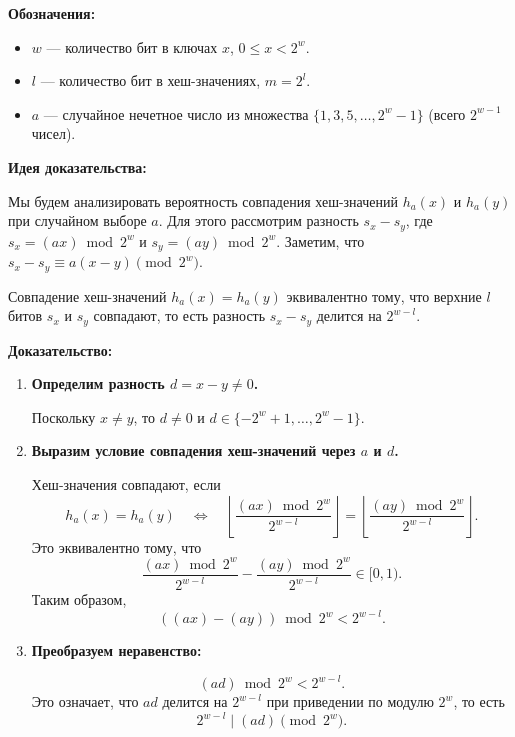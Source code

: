 \documentclass[11pt]{article}
\renewcommand{\le}{\leqslant}   %
\begin{document}
\begin{solution}
    \textbf{Обозначения:}
    
    \begin{itemize}
        \item $w$ — количество бит в ключах $x$, $0 \le x < 2^w$.
        \item $l$ — количество бит в хеш-значениях, $m = 2^l$.
        \item $a$ — случайное нечетное число из множества $\{1, 3, 5, \dots, 2^w - 1\}$ (всего $2^{w - 1}$ чисел).
    \end{itemize}
    
    \textbf{Идея доказательства:}
    
    Мы будем анализировать вероятность совпадения хеш-значений $h_{a}(x)$ и $h_{a}(y)$ при случайном выборе $a$. Для этого рассмотрим разность $s_x - s_y$, где $s_x = (a x) \bmod 2^w$ и $s_y = (a y) \bmod 2^w$. Заметим, что $s_x - s_y \equiv a (x - y) \pmod{2^w}$.
    
    Совпадение хеш-значений $h_{a}(x) = h_{a}(y)$ эквивалентно тому, что верхние $l$ битов $s_x$ и $s_y$ совпадают, то есть разность $s_x - s_y$ делится на $2^{w - l}$.
    
    \textbf{Доказательство:}
    
    \begin{enumerate}
        \item \textbf{Определим разность $d = x - y \not= 0$.}
    
        Поскольку $x \not= y$, то $d \not= 0$ и $d \in \{-2^w + 1, \dots, 2^w - 1\}$.
    
        \item \textbf{Выразим условие совпадения хеш-значений через $a$ и $d$.}
    
        Хеш-значения совпадают, если
        \[
        h_{a}(x) = h_{a}(y) \quad \Leftrightarrow \quad \left\lfloor \dfrac{(a x) \bmod 2^w}{2^{w - l}} \right\rfloor = \left\lfloor \dfrac{(a y) \bmod 2^w}{2^{w - l}} \right\rfloor.
        \]
        Это эквивалентно тому, что
        \[
        \dfrac{(a x) \bmod 2^w}{2^{w - l}} - \dfrac{(a y) \bmod 2^w}{2^{w - l}} \in [0,1).
        \]
        Таким образом,
        \[
        ((a x) - (a y)) \bmod 2^w < 2^{w - l}.
        \]
        \item \textbf{Преобразуем неравенство:}
    
        \[
        (a d) \bmod 2^w < 2^{w - l}.
        \]
        Это означает, что $a d$ делится на $2^{w - l}$ при приведении по модулю $2^w$, то есть
        \[
        2^{w - l} \mid (a d) \pmod{2^w}.
        \]
    

\end{enumerate}
\end{solution}
\end{document}

